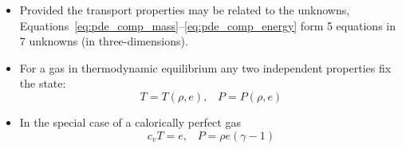 \documentclass[compress,11pt]{beamer}
\begin{document}
\frame
{
  \begin{itemize}
    \item Provided the transport properties may be related to the unknowns, Equations~\eqref{eq:pde_comp_mass}--\eqref{eq:pde_comp_energy} form 5 equations in 7 unknowns (in three-dimensions).
    \item For a gas in thermodynamic equilibrium any two independent properties fix the state:
      \begin{equation*}
	T = T\left(\rho,e\right),\;\;\; P = P\left(\rho,e\right)
      \end{equation*}
    \item In the special case of a calorically perfect gas
      \begin{equation*}
	c_v T = e,\;\;\; P = \rho e\left(\gamma-1\right)
      \end{equation*}
  \end{itemize}
}

      
	  
\end{document}
